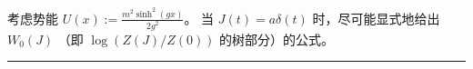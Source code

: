 \begin{exercise} 
 考虑势能 $U(x):=\frac{m^2\sinh^2(gx)}{2g^2}$。
 当 $J(t)=a\delta(t)$ 时，尽可能显式地给出 $W_0(J)$
（即 $\log(Z(J)/Z(0))$ 的树部分）的公式。
\end{exercise} 

\bigskip
\noindent\rule{\textwidth}{0.6pt}

